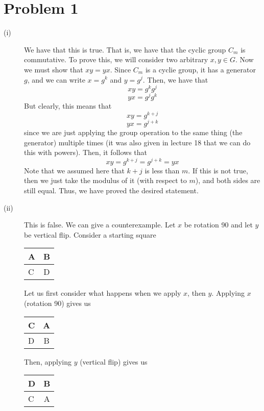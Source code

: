 \documentclass{article}
\begin{document}
\section*{Problem 1}
\begin{description}
    \item[(i)] We have that this is true. That is, we have that the cyclic
        group $C_m$ is commutative. To prove this, we will consider two
        arbitrary $x,y \in G$. Now we must show that $xy = yx$. Since
        $C_m$ is a cyclie group, it has a generator $g$, and we can write
        $x = g^k$ and $y = g^j$. Then, we have that
        \[ xy = g^k g^j \]
        \[ yx = g^j g^k \]
        But clearly, this means that
        \[ xy = g^{k+j} \]
        \[ yx = g^{j+k} \]
        since we are just applying the group operation to the same thing
        (the generator) multiple times (it was also given in lecture 18 that
        we can do this with powers). Then, it follows that
        \[ xy = g^{k+j} = g^{j+k} = yx \]
        Note that we assumed here that $k+j$ is less than $m$. If this is not
        true, then we just take the modulus of it (with respect to $m$),
        and both sides are still equal. Thus, we have proved the desired statement.
    \item[(ii)] This is false. We can give a counterexample. Let
        $x$ be rotation 90 and let $y$ be vertical flip. Consider a starting
        square

        \begin{tabular}{ | l | c | }
            \hline
            A & B \\ \hline
            C & D \\
            \hline
        \end{tabular}

        Let us first consider what happens when we apply $x$, then $y$.
        Applying $x$ (rotation 90) gives us

        \begin{tabular}{ | l | c | }
            \hline
            C & A \\ \hline
            D & B \\
            \hline
        \end{tabular}

        Then, applying $y$ (vertical flip) gives us

        \begin{tabular}{ | l | c | }
            \hline
            D & B \\ \hline
            C & A \\
            \hline
        \end{tabular}


\end{description}
\end{document}
